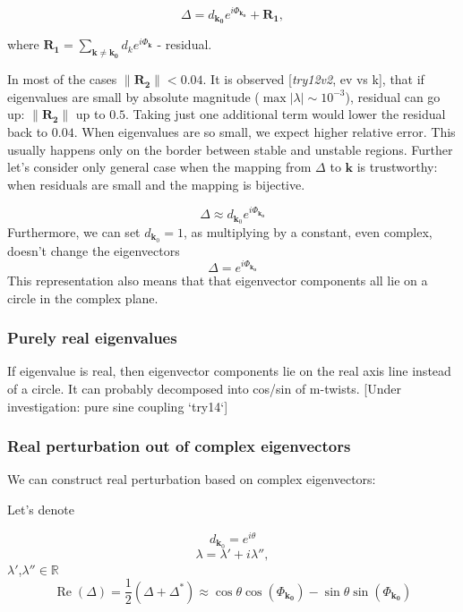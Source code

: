 \documentclass[a4paper,10pt]{article}
\renewcommand*{\Re}{\operatorname{Re}}
\renewcommand*{\vec}[1]{\mathbf{#1}}
\newcommand*{\D}{\Delta}%
\begin{document}
$$
\D = d_{\mathbf{k_0}} e^{i \Phi_\mathbf{k_0}}  + \mathbf{R_1},
$$

where $\mathbf{R_1} = \sum_{\mathbf{\vec{k} \neq \mathbf{k_0}}} d_k e^{i \Phi_\vec{k}}$ - residual.

In most of the cases $\lVert \mathbf{R_2} \rVert < 0.04$. It is observed [\textit{try12v2}, ev vs k], that if eigenvalues are small by absolute magnitude ($\max|\lambda| \sim  10^{-3}$), residual can go up: $\lVert \mathbf{R_2} \rVert$ up to $0.5$. Taking just one additional term would lower the residual back to $0.04$. When eigenvalues are so small, we expect higher relative error. This usually happens only on the border between stable and unstable regions. Further let's consider only general case when the mapping from $\D$ to $\vec{k}$ is trustworthy: when residuals are small and the mapping is bijective.

\begin{equation}
\D \approx d_{\vec{k}_0} e^{i \Phi_\mathbf{k_0}}
\end{equation}
Furthermore, we can set $d_{\vec{k}_0} = 1$, as multiplying by a constant, even complex, doesn't change the eigenvectors 
\begin{equation}
\D = e^{i \Phi_\mathbf{k_0}} 
\label{eqn:delta_to_k}
\end{equation}
This representation also means that that eigenvector components all lie on a circle in the complex plane. 
\subsubsection{Purely real eigenvalues}

If eigenvalue is real, then eigenvector components lie on the real axis line instead of a circle. It can probably decomposed into cos/sin of m-twists. [Under investigation: pure sine coupling `try14`]

\subsubsection{Real perturbation out of complex eigenvectors}

We can construct real perturbation based on complex eigenvectors:


Let's denote

$$
d_{\vec{k}_0} = e^{i \theta}
$$
$$
\lambda = \lambda' + i \lambda'',
$$
$\lambda'$,$\lambda'' \in \mathbb{R}$
$$
\Re(\D)
= \frac{1}{2} ( \D + \D^*) 
\approx  \cos \theta \cos(\Phi_{\mathbf{k_0}}) - \sin \theta \sin(\Phi_{\mathbf{k_0}})
$$
\end{document}

